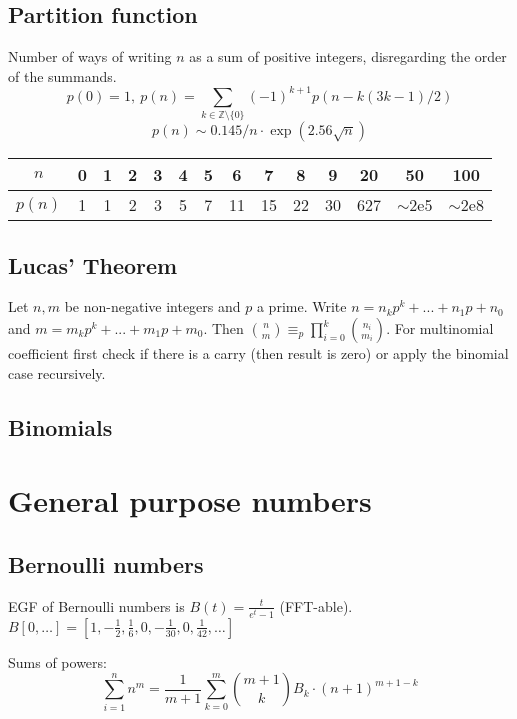 \subsection{Partition function}
		Number of ways of writing $n$ as a sum of positive integers, disregarding the order of the summands.
		\[ p(0) = 1,\ p(n) = \sum_{k \in \mathbb Z \setminus \{0\}}{(-1)^{k+1} p(n - k(3k-1) / 2)} \]
		\[ p(n) \sim 0.145 / n \cdot \exp(2.56 \sqrt{n}) \]

		\begin{center}
		\begin{tabular}{c|c@{\ }c@{\ }c@{\ }c@{\ }c@{\ }c@{\ }c@{\ }c@{\ }c@{\ }c@{\ }c@{\ }c@{\ }c}
			$n$    & 0 & 1 & 2 & 3 & 4 & 5 & 6  & 7  & 8  & 9  & 20  & 50  & 100 \\ \hline
			$p(n)$ & 1 & 1 & 2 & 3 & 5 & 7 & 11 & 15 & 22 & 30 & 627 & $\mathtt{\sim}$2e5 & $\mathtt{\sim}$2e8 \\
		\end{tabular}
		\end{center}

	\subsection{Lucas' Theorem}
		Let $n,m$ be non-negative integers and $p$ a prime. Write $n=n_kp^k+...+n_1p+n_0$ and $m=m_kp^k+...+m_1p+m_0$. Then $\binom{n}{m} \equiv_p \prod_{i=0}^k\binom{n_i}{m_i}$. For multinomial coefficient first check if there is a carry (then result is zero) or apply the binomial case recursively.

	\subsection{Binomials}

\section{General purpose numbers}
	\subsection{Bernoulli numbers}
		EGF of Bernoulli numbers is $B(t)=\frac{t}{e^t-1}$ (FFT-able).
		$B[0,\ldots] = [1, -\frac{1}{2}, \frac{1}{6}, 0, -\frac{1}{30}, 0, \frac{1}{42}, \ldots]$

		Sums of powers:
		\small
		\[ \sum_{i=1}^n n^m = \frac{1}{m+1} \sum_{k=0}^m \binom{m+1}{k} B_k \cdot (n+1)^{m+1-k} \]
		\normalsize


